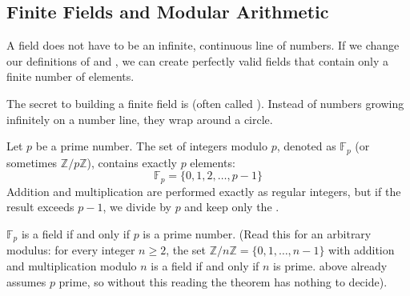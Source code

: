 \subsection{Finite Fields and Modular Arithmetic}

A field does not have to be an infinite, continuous line of numbers. If we change our definitions of  and , we can create perfectly valid fields that contain only a finite number of elements.

The secret to building a finite field is  (often called ). Instead of numbers growing infinitely on a number line, they wrap around a circle.

\begin{center}
\end{center}

\begin{definition}
\label{def:field_fp}
Let $p$ be a prime number. The set of integers modulo $p$, denoted as $\mathbb{F}_p$ (or sometimes $\mathbb{Z}/p\mathbb{Z}$), contains exactly $p$ elements:
\[
\mathbb{F}_p = \{0, 1, 2, \dots, p-1\}
\]
Addition and multiplication are performed exactly as regular integers, but if the result exceeds $p-1$, we divide by $p$ and keep only the .
\end{definition}

\begin{theorem}
\label{thm:fp_is_field}
$\mathbb{F}_p$ is a field if and only if $p$ is a prime number.
(Read this for an arbitrary modulus: for every integer $n \ge 2$, the set $\mathbb{Z}/n\mathbb{Z} = \{0, 1, \dots, n-1\}$ with addition and multiplication modulo $n$ is a field if and only if $n$ is prime.  above already assumes $p$ prime, so without this reading the theorem has nothing to decide).
\end{theorem}

